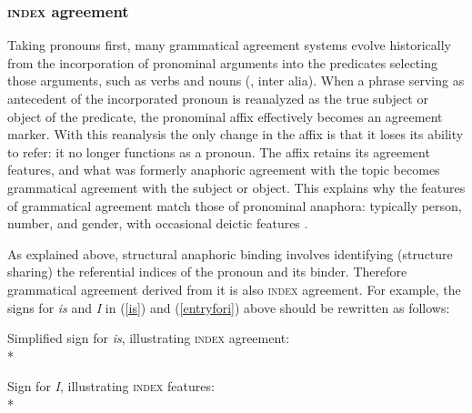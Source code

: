 \documentclass[output=paper
	        ,collection
	        ,collectionchapter
 	        ,biblatex
                ,babelshorthands
                ,newtxmath
                ,draftmode
                ,colorlinks, citecolor=brown
]{langscibook}
\begin{document}
\subsubsection{\textsc{index} agreement}
Taking pronouns first, many grammatical agreement systems evolve historically from the incorporation of pronominal arguments into the predicates selecting those arguments, such as verbs and nouns (\citealt{bopp:1842,givon:1976,wald:1979}, inter alia).  When a phrase serving as antecedent of the incorporated pronoun is reanalyzed as the true subject or object of the predicate,  the pronominal affix effectively becomes an agreement marker.  With this reanalysis the only change in the affix is that it loses its ability to refer: it no longer functions as a pronoun.   The affix retains its agreement features, and what was formerly anaphoric agreement with the topic becomes grammatical agreement with the subject or object.  This explains why the features of grammatical agreement match those of pronominal anaphora: typically person, number, and gender, with occasional deictic features  \citep[752]{bresnan+mchombo:1987}.   

As explained above, structural anaphoric binding involves identifying (structure sharing) the referential indices of the pronoun and its binder.   Therefore grammatical agreement derived from it is also \textsc{index} agreement.   For example, the signs for  \textit{is} and \textit{I} in (\ref{is}) and (\ref{entryfori}) above should be rewritten as follows:

\begin{exe} 

\ex 	\label{is2}
	Simplified sign for \textit{is}, illustrating \textsc{index} agreement:\\*
\end{exe}

\begin{exe} 
\ex	\label{entryfori2}
Sign for  \textit{I}, illustrating  \textsc{index} features:\\*
\end{exe}
\end{document}
